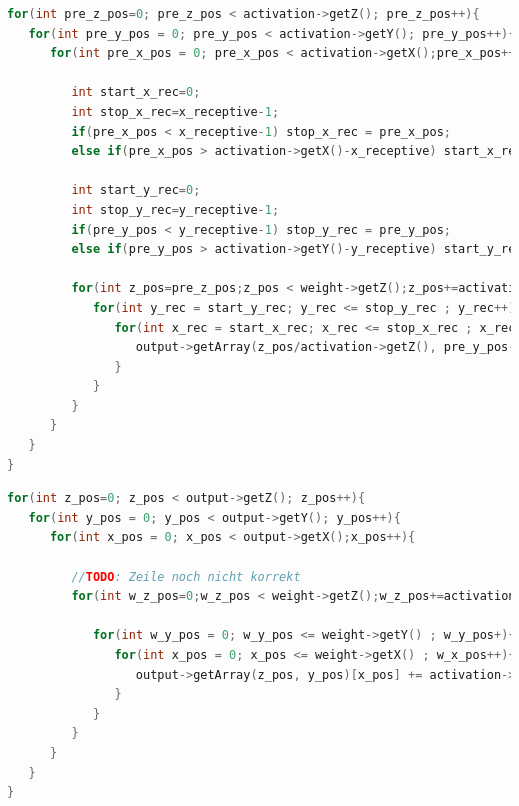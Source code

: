 \documentclass[../main.tex]{subfiles}
\begin{document}
\begin{lstlisting}[language=c++, caption=Convolution: Activation durchgehen, captionpos=b, label=listing:conv_activation, frame=single, linewidth=\textwidth, breaklines=true]
for(int pre_z_pos=0; pre_z_pos < activation->getZ(); pre_z_pos++){
   for(int pre_y_pos = 0; pre_y_pos < activation->getY(); pre_y_pos++){
      for(int pre_x_pos = 0; pre_x_pos < activation->getX();pre_x_pos++){

         int start_x_rec=0;
         int stop_x_rec=x_receptive-1;
         if(pre_x_pos < x_receptive-1) stop_x_rec = pre_x_pos;
         else if(pre_x_pos > activation->getX()-x_receptive) start_x_rec = x_receptive + pre_x_pos - activation->getX();

         int start_y_rec=0;
         int stop_y_rec=y_receptive-1;
         if(pre_y_pos < y_receptive-1) stop_y_rec = pre_y_pos;
         else if(pre_y_pos > activation->getY()-y_receptive) start_y_rec = y_receptive + pre_y_pos - activ[language=c++]ation->getY();
         
         for(int z_pos=pre_z_pos;z_pos < weight->getZ();z_pos+=activation->getZ()){
            for(int y_rec = start_y_rec; y_rec <= stop_y_rec ; y_rec++){
               for(int x_rec = start_x_rec; x_rec <= stop_x_rec ; x_rec++){
                  output->getArray(z_pos/activation->getZ(), pre_y_pos-y_rec)[pre_x_pos-x_rec] += activation->getArray(pre_z_pos,pre_y_pos)[pre_x_pos] * weight->getArray(z_pos,y_rec)[x_rec];
               }
            }
         }
      }
   }
}
\end{lstlisting}

\begin{lstlisting}[language=c++, caption=Convolution: Output durchgehen, captionpos=b, label=listing:conv_output, frame=single, linewidth=\textwidth, breaklines=true]
for(int z_pos=0; z_pos < output->getZ(); z_pos++){
   for(int y_pos = 0; y_pos < output->getY(); y_pos++){
      for(int x_pos = 0; x_pos < output->getX();x_pos++){
      
         //TODO: Zeile noch nicht korrekt
         for(int w_z_pos=0;w_z_pos < weight->getZ();w_z_pos+=activation->getZ()){
         
            for(int w_y_pos = 0; w_y_pos <= weight->getY() ; w_y_pos+){
               for(int x_pos = 0; x_pos <= weight->getX() ; w_x_pos++){
                  output->getArray(z_pos, y_pos)[x_pos] += activation->getArray(z_pos,y_pos+w_y_pos)[x_pos+w_x_pos] * weight->getArray(w_z_pos,w_y_rec)[w_x_rec];
               }
            }
         }
      }
   }
}
\end{lstlisting}
\end{document}
